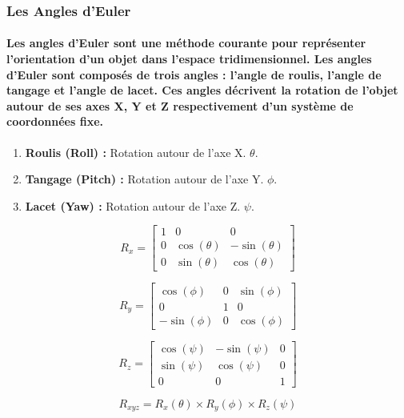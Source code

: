 \subsubsection{Les Angles d'Euler}

\paragraph{Les angles d'Euler sont une méthode courante pour représenter l'orientation d'un objet dans l'espace tridimensionnel. Les angles d'Euler sont composés de trois angles : l'angle de roulis, l'angle de tangage et l'angle de lacet. Ces angles décrivent la rotation de l'objet autour de ses axes X, Y et Z respectivement d'un système de coordonnées fixe.}


\begin{enumerate}
	\item \textbf{Roulis (Roll) :} Rotation autour de l'axe X. $\theta$.
	\item \textbf{Tangage (Pitch) :} Rotation autour de l'axe Y. $\phi$.
	\item \textbf{Lacet (Yaw) :} Rotation autour de l'axe Z. $\psi$.
\end{enumerate}

\begin{equation*}
	R_x = \begin{bmatrix}
		1 & 0 & 0 \\
		0 & \cos(\theta) & -\sin(\theta) \\
		0 & \sin(\theta) & \cos(\theta)
	\end{bmatrix}
\end{equation*}

\begin{equation*}
	R_y = \begin{bmatrix}
		\cos(\phi) & 0 & \sin(\phi) \\
		0 & 1 & 0 \\
		-\sin(\phi) & 0 & \cos(\phi)
	\end{bmatrix}
\end{equation*}

\begin{equation*}
	R_z = \begin{bmatrix}
		\cos(\psi) & -\sin(\psi) & 0 \\
		\sin(\psi) & \cos(\psi) & 0 \\
		0 & 0 & 1
	\end{bmatrix}
\end{equation*}

\begin{equation*}
	R_{xyz} = R_x(\theta) \times R_y(\phi) \times R_z(\psi)
\end{equation*}


